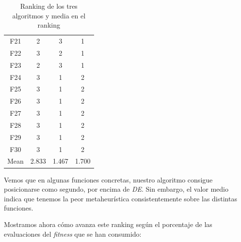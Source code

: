 \documentclass[11pt]{article}
\begin{document}
\begin{table}[H]
\begin{tabular}{|c|c|c|c|}
F21  &             2 &      3 &      1 \\
F22  &             3 &      2 &      1 \\
F23  &             2 &      3 &      1 \\
F24  &             3 &      1 &      2 \\
F25  &             3 &      1 &      2 \\
F26  &             3 &      1 &      2 \\
F27  &             3 &      1 &      2 \\
F28  &             3 &      1 &      2 \\
F29  &             3 &      1 &      2 \\
F30  &             3 &      1 &      2 \\
Mean &         2.833 &  1.467 &  1.700 \\
\hline
\end{tabular}
    \caption{Ranking de los tres algoritmos y media en el ranking}
\end{table}

Vemos que en algunas funciones concretas, nuestro algoritmo consigue posicionarse como segundo, por encima de \emph{DE}. Sin embargo, el valor medio indica que tenemos la peor metaheurística consistentemente sobre las distintas funciones.

Mostramos ahora cómo avanza este ranking según el porcentaje de las evaluaciones del \emph{fitness} que se han consumido:

\begin{table}[H]
\centering
{}
    \caption{Ranking según el avance del porcentaje de evaluaciones consumidas}
    \label{ranking_1}
\end{table}
\end{document}
